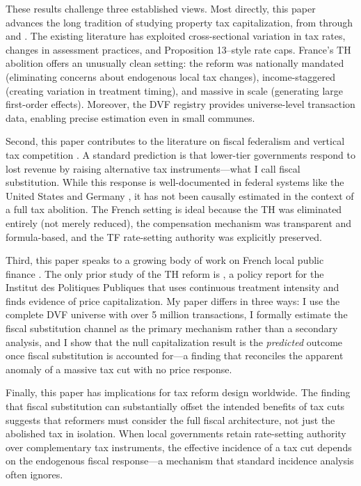 \documentclass[12pt]{article}
\begin{document}
These results challenge three established views. Most directly, this paper advances the long tradition of studying property tax capitalization, from \citet{oates1969} through \citet{palmon1998} and \citet{lutz2015}. The existing literature has exploited cross-sectional variation in tax rates, changes in assessment practices, and Proposition 13--style rate caps. France's TH abolition offers an unusually clean setting: the reform was nationally mandated (eliminating concerns about endogenous local tax changes), income-staggered (creating variation in treatment timing), and massive in scale (generating large first-order effects). Moreover, the DVF registry provides universe-level transaction data, enabling precise estimation even in small communes.

Second, this paper contributes to the literature on fiscal federalism and vertical tax competition \citep{zodrow1986, baicker2012}. A standard prediction is that lower-tier governments respond to lost revenue by raising alternative tax instruments---what I call fiscal substitution. While this response is well-documented in federal systems like the United States and Germany \citep{suarez2016, fuest2018}, it has not been causally estimated in the context of a full tax abolition. The French setting is ideal because the TH was eliminated entirely (not merely reduced), the compensation mechanism was transparent and formula-based, and the TF rate-setting authority was explicitly preserved.

Third, this paper speaks to a growing body of work on French local public finance \citep{bach2023, cherchye2024, gobillon2012}. The only prior study of the TH reform is \citet{bach2023}, a policy report for the Institut des Politiques Publiques that uses continuous treatment intensity and finds evidence of price capitalization. My paper differs in three ways: I use the complete DVF universe with over 5 million transactions, I formally estimate the fiscal substitution channel as the primary mechanism rather than a secondary analysis, and I show that the null capitalization result is the \emph{predicted} outcome once fiscal substitution is accounted for---a finding that reconciles the apparent anomaly of a massive tax cut with no price response.

Finally, this paper has implications for tax reform design worldwide. The finding that fiscal substitution can substantially offset the intended benefits of tax cuts suggests that reformers must consider the full fiscal architecture, not just the abolished tax in isolation. When local governments retain rate-setting authority over complementary tax instruments, the effective incidence of a tax cut depends on the endogenous fiscal response---a mechanism that standard incidence analysis often ignores.
\end{document}
